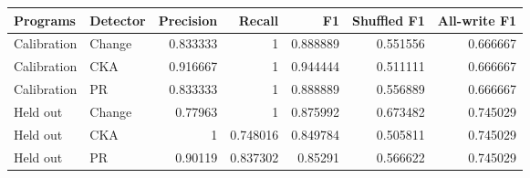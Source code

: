 \begin{center}\small
\begin{tabular}{@{}llrrrrr@{}}
\toprule
Programs & Detector & Precision & Recall & F1 & Shuffled F1 & All-write F1 \\
\midrule
Calibration & Change & 0.833333 & 1 & 0.888889 & 0.551556 & 0.666667 \\
Calibration & CKA & 0.916667 & 1 & 0.944444 & 0.511111 & 0.666667 \\
Calibration & PR & 0.833333 & 1 & 0.888889 & 0.556889 & 0.666667 \\
Held out & Change & 0.77963 & 1 & 0.875992 & 0.673482 & 0.745029 \\
Held out & CKA & 1 & 0.748016 & 0.849784 & 0.505811 & 0.745029 \\
Held out & PR & 0.90119 & 0.837302 & 0.85291 & 0.566622 & 0.745029 \\
\bottomrule
\end{tabular}
\end{center}
